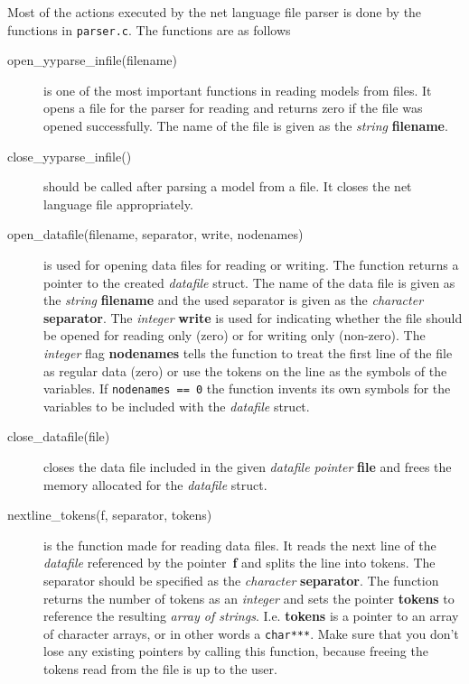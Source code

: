 \documentclass[12pt,a4paper]{report}
\newcommand{\cdatatype}[1]{{\it #1}}
\newcommand{\examplecode}[1]{\texttt{#1}}
\newcommand{\cfilename}[1]{\texttt{#1}}
\newcommand{\cparameter}[1]{\textbf{#1}}
\begin{document}
Most of the actions executed by the net language file parser is done by the
functions in \cfilename{parser.c}. The functions are as follows
\begin{description}
\item[open\_yyparse\_infile(filename)] is one of the most important
functions in reading models from files. It opens a file for the parser
for reading and returns zero if the file was opened successfully. The 
name of the file is given as the \cdatatype{string} \cparameter{filename}.

\item[close\_yyparse\_infile()] should be called after parsing a model
from a file. It closes the net language file appropriately.

\item[open\_datafile(filename, separator, write, nodenames)] is used
for opening data files for reading or writing. The function returns a 
pointer to the created \cdatatype{datafile} struct. The name of the data
file is given as the \cdatatype{string} \cparameter{filename} and the used
separator is given as the \cdatatype{character}
\cparameter{separator}. The \cdatatype{integer} \cparameter{write} is used
for indicating whether the file should be opened for reading only
(zero) or for writing only (non-zero). The \cdatatype{integer} flag
\cparameter{nodenames} tells the function to treat the first line of
the file as regular data (zero) or use the tokens on the line as the 
symbols of the variables. If \examplecode{nodenames == 0} the function 
invents its own symbols for the variables to be included with the 
\cdatatype{datafile} struct.

\item[close\_datafile(file)] closes the data file included in the
given \cdatatype{datafile pointer} \cparameter{file} and frees the memory
allocated for the \cdatatype{datafile} struct.

\item[nextline\_tokens(f, separator, tokens)] is the function made for
reading data files. It reads the next line of the \cdatatype{datafile}
referenced by the pointer~\cparameter{f} and splits the line into
tokens. The separator should be specified as the \cdatatype{character}
\cparameter{separator}. The function returns the number of tokens as an 
\cdatatype{integer} and sets the pointer \cparameter{tokens} to
reference the resulting \cdatatype{array of strings}. I.e. 
\cparameter{tokens} is a pointer to an array of character arrays, or
in other words a \examplecode{char***}. Make sure that you don't lose 
any existing pointers by calling this function, because freeing the 
tokens read from the file is up to the user.


\end{description}
\end{document}
